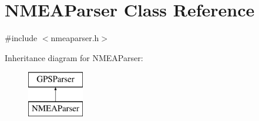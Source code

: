\hypertarget{class_n_m_e_a_parser}{\section{\-N\-M\-E\-A\-Parser \-Class \-Reference}
\label{class_n_m_e_a_parser}
}


{\ttfamily \#include $<$nmeaparser.\-h$>$}

\-Inheritance diagram for \-N\-M\-E\-A\-Parser\-:\begin{figure}[H]
\begin{center}
\leavevmode
\includegraphics[height=2.000000cm]{class_n_m_e_a_parser}
\end{center}
\end{figure}
